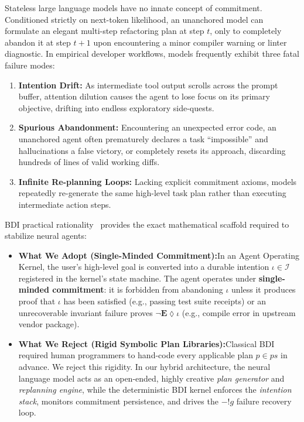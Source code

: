 \documentclass[11pt,a4paper]{article}
\begin{document}
Stateless large language models have no innate concept of commitment. Conditioned strictly on next-token likelihood, an unanchored model can formulate an elegant multi-step refactoring plan at step $t$, only to completely abandon it at step $t+1$ upon encountering a minor compiler warning or linter diagnostic. In empirical developer workflows, models frequently exhibit three fatal failure modes:
\begin{enumerate}[leftmargin=1.8em,itemsep=2pt]
  \item \textbf{Intention Drift:} As intermediate tool output scrolls across the prompt buffer, attention dilution causes the agent to lose focus on its primary objective, drifting into endless exploratory side-quests.
  \item \textbf{Spurious Abandonment:} Encountering an unexpected error code, an unanchored agent often prematurely declares a task ``impossible'' and hallucinations a false victory, or completely resets its approach, discarding hundreds of lines of valid working diffs.
  \item \textbf{Infinite Re-planning Loops:} Lacking explicit commitment axioms, models repeatedly re-generate the same high-level task plan rather than executing intermediate action steps.
\end{enumerate}

BDI practical rationality~ provides the exact mathematical scaffold required to stabilize neural agents:
\begin{itemize}[leftmargin=1.8em,itemsep=2pt]
  \item \textbf{What We Adopt (Single-Minded Commitment):}\enspace In an Agent Operating Kernel, the user's high-level goal is converted into a durable intention $\iota \in \mathcal{I}$ registered in the kernel's state machine. The agent operates under \textbf{single-minded commitment}: it is forbidden from abandoning $\iota$ unless it produces proof that $\iota$ has been satisfied (e.g., passing test suite receipts) or an unrecoverable invariant failure proves $\neg\mathbf{E}\lozenge \iota$ (e.g., compile error in upstream vendor package).
  \item \textbf{What We Reject (Rigid Symbolic Plan Libraries):}\enspace Classical BDI required human programmers to hand-code every applicable plan $p \in ps$ in advance. We reject this rigidity. In our hybrid architecture, the neural language model acts as an open-ended, highly creative \emph{plan generator} and \emph{replanning engine}, while the deterministic BDI kernel enforces the \emph{intention stack}, monitors commitment persistence, and drives the $-!g$ failure recovery loop.
\end{itemize}
\end{document}
